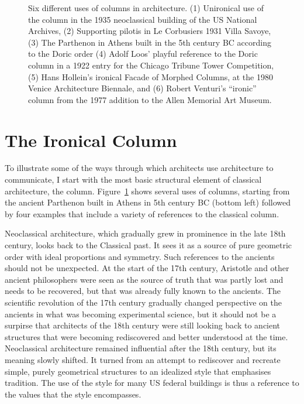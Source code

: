 \begin{figure}[t]
\caption{Six different uses of columns in architecture. (1) Unironical use of the column in the 1935
neoclassical building of the US National Archives, (2) Supporting pilotis in Le Corbusiers 1931
Villa Savoye, (3) The Parthenon in Athens built in the 5th century BC according to the Doric order
(4) Adolf Loos' playful reference to the Doric column in a 1922 entry for the Chicago Tribune
Tower Competition, (5) Hans Hollein's ironical Facade of Morphed Columns, at the 1980 Venice
Architecture Biennale, and (6) Robert Venturi's ``ironic'' column from the 1977 addition to the
Allen Memorial Art Museum.}
\label{fig:columns}
\vspace{-1em}
\end{figure}

\section{The Ironical Column}
To illustrate some of the ways through which architects use architecture to communicate, I start
with the most basic structural element of classical architecture, the column. Figure~\ref{fig:columns}
shows several uses of columns, starting from the ancient Parthenon built in Athens in 5th century
BC (bottom left) followed by four examples that include a variety of references to the classical
column.

\newpage

Neoclassical architecture, which gradually grew in prominence in the late 18th century, looks
back to the Classical past. It sees it as a source of pure geometric order with ideal proportions
and symmetry. Such references to the ancients should not be unexpected. At the start of the 17th
century, Aristotle and other ancient philosophers were seen as the source of truth that was partly
lost and needs to be recovered, but that was already fully known to the ancients.
The scientific revolution of the 17th century gradually changed perspective on the ancients in what
was becoming experimental science, but it should not be a surpirse that architects of the 18th century
were still looking back to ancient structures that were becoming rediscovered and better understood
at the time. Neoclassical architecture remained influential after the 18th century, but its meaning
slowly shifted. It turned from an attempt to rediscover and recreate simple, purely geometrical
structures to an idealized style that emphasises tradition. The use of the style for many US federal
buildings is thus a reference to the values that the style encompasses.

